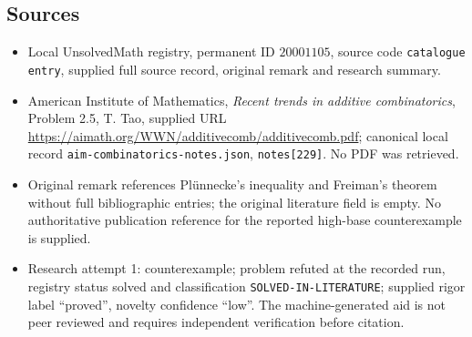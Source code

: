 \documentclass[11pt]{article}
\begin{document}
\subsection{Sources}
\begin{itemize}
\item Local UnsolvedMath registry, permanent ID $20001105$, source code \texttt{catalogue entry}, supplied full source record, original remark and research summary.
\item American Institute of Mathematics, \emph{Recent trends in additive combinatorics}, Problem 2.5, T. Tao, supplied URL \url{https://aimath.org/WWN/additivecomb/additivecomb.pdf}; canonical local record \texttt{aim-combinatorics-notes.json}, \texttt{notes[229]}. No PDF was retrieved.
\item Original remark references Pl\"unnecke's inequality and Freiman's theorem without full bibliographic entries; the original literature field is empty. No authoritative publication reference for the reported high-base counterexample is supplied.
\item Research attempt 1: counterexample; problem refuted at the recorded run, registry status solved and classification \texttt{SOLVED-IN-LITERATURE}; supplied rigor label ``proved'', novelty confidence ``low''. The machine-generated aid is not peer reviewed and requires independent verification before citation.
\end{itemize}
\end{document}

